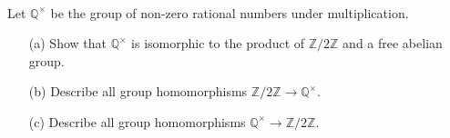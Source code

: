 \documentclass{article}
\def\zz{{\mathbb Z}}
\def\qq{{\mathbb Q}}
\begin{document}
\begin{problem} \\
    Let $\qq^\times$ be the group of non-zero rational numbers under multiplication.
    \begin{enumerate}
        \item[(a)] Show that $\qq^\times$ is isomorphic to the product of $\zz/2\zz$ and a free abelian group. %
        \item[(b)] Describe all group homomorphisms $\zz/2\zz \to \qq^\times$. %
        \item[(c)] Describe all group homomorphisms $\qq^\times \to \zz/2\zz$. %
    \end{enumerate}
\end{problem}
\end{document}
